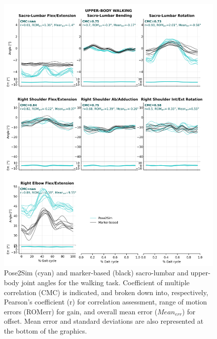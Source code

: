 \begin{figure}[!ht]
	\centering
	\def\svgwidth{1\columnwidth}
	\fontsize{10pt}{10pt}\selectfont
	\includegraphics[height=\dimexpr\textheight-119pt]{"../Annexes/Figures/Fig_QTMWalkUp.png"}
	\caption{Pose2Sim (cyan) and marker-based (black) sacro-lumbar and upper-body joint angles for the walking task. Coefficient of multiple correlation (CMC) is indicated, and broken down into, respectively, Pearson’s coefficient (r) for correlation assessment, range of motion errors (ROMerr) for gain, and overall mean error (\(Mean_{err}\)) for offset. Mean error and standard deviations are also represented at the bottom of the graphics.}
	\label{fig_qtmwalkup}
\end{figure}


